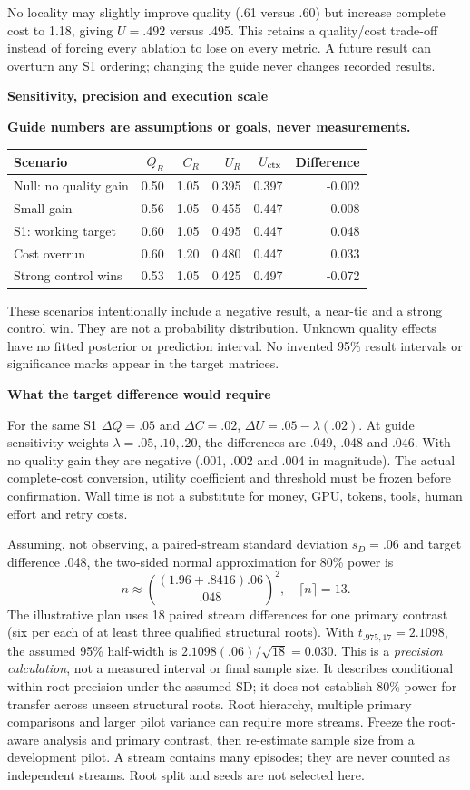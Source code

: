\documentclass[10pt,a4paper]{article}
\newcommand{\status}{\textcolor{red!70!black}{\textbf{Guide numbers are assumptions or goals, never measurements.}}\par}
\newcommand{\lead}[1]{\vspace{4pt}\textbf{#1}\par}
\begin{document}
No locality may slightly improve quality (.61 versus .60) but increase complete
cost to 1.18, giving $U=.492$ versus .495. This retains a quality/cost trade-off
instead of forcing every ablation to lose on every metric. A future result can
overturn any S1 ordering; changing the guide never changes recorded results.

\clearpage
\lead{Sensitivity, precision and execution scale}
\status
\begin{center}\small
\begin{tabular*}{\linewidth}{@{\extracolsep{\fill}}lrrrrr@{}}\toprule
Scenario & $Q_R$ & $C_R$ & $U_R$ & $U_{\rm ctx}$ & Difference\\\midrule
Null: no quality gain & 0.50 & 1.05 & 0.395 & 0.397 & -0.002\\
Small gain & 0.56 & 1.05 & 0.455 & 0.447 & 0.008\\
S1: working target & 0.60 & 1.05 & 0.495 & 0.447 & 0.048\\
Cost overrun & 0.60 & 1.20 & 0.480 & 0.447 & 0.033\\
Strong control wins & 0.53 & 1.05 & 0.425 & 0.497 & -0.072\\
\bottomrule\end{tabular*}\end{center}
These scenarios intentionally include a negative result, a near-tie and a strong
control win. They
are not a probability distribution. Unknown quality effects have no fitted
posterior or prediction interval. No invented 95\% result intervals or
significance marks appear in the target matrices.

\lead{What the target difference would require}
For the same S1 $\Delta Q=.05$ and $\Delta C=.02$,
$\Delta U=.05-\lambda(.02)$. At guide sensitivity weights
$\lambda=.05,.10,.20$, the differences are .049, .048 and .046.
With no quality gain they are negative (.001, .002 and .004 in magnitude).
The actual complete-cost conversion, utility coefficient and threshold must be
frozen before confirmation. Wall time is not a substitute for money, GPU,
tokens, tools, human effort and retry costs.

Assuming, not observing, a paired-stream standard deviation $s_D=.06$ and
target difference .048, the two-sided normal approximation for 80\% power is
\[
 n\approx\left(\frac{(1.96+.8416).06}{.048}\right)^2,
 \quad \lceil n\rceil=13.
\]
The illustrative plan uses 18 paired stream differences for one primary contrast
(six per each of at least three qualified structural roots). With
$t_{.975,17}=2.1098$, the assumed
95\% half-width is $2.1098(.06)/\sqrt{18}=0.030$.
This is a \emph{precision calculation}, not a measured interval or final sample
size. It describes conditional within-root precision under the assumed SD; it
does not establish 80\% power for transfer across unseen structural roots.
Root hierarchy, multiple primary comparisons and larger pilot variance can
require more streams. Freeze the root-aware analysis and primary contrast, then
re-estimate sample size from a development pilot. A stream contains many episodes; they are never
counted as independent streams. Root split and seeds are not selected here.
\end{document}
